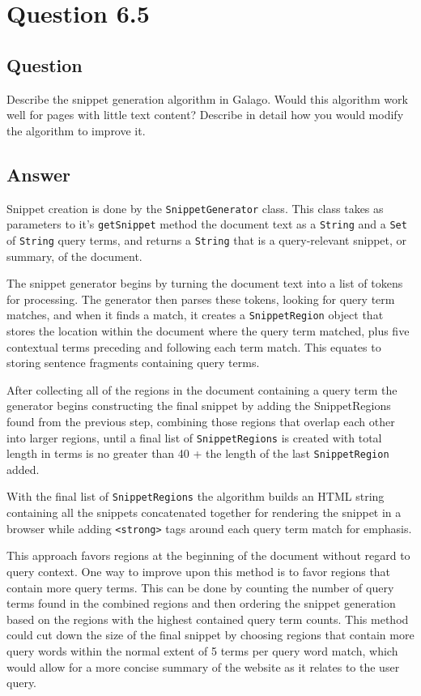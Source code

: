 \section{Question 6.5}

\subsection{Question}
Describe the snippet generation algorithm in Galago. Would this algorithm
work well for pages with little text content? Describe in detail how you would
modify the algorithm to improve it.


\subsection{Answer}
Snippet creation is done by the \texttt{SnippetGenerator} class.  This class takes as parameters to it's \texttt{getSnippet} method the document text as a \texttt{String} and a \texttt{Set} of \texttt{String} query terms, and returns a \texttt{String} that is a query-relevant snippet, or summary, of the document.

The snippet generator begins by turning the document text into a list of tokens for processing.  The generator then parses these tokens, looking for query term matches, and when it finds a match, it creates a \texttt{SnippetRegion} object that stores the location within the document where the query term matched, plus five contextual terms preceding and following each term match.  This equates to storing sentence fragments containing query terms.

After collecting all of the regions in the document containing a query term the generator begins constructing the final snippet by adding the SnippetRegions found from the previous step, combining those regions that overlap each other into larger regions, until a final list of \texttt{SnippetRegions} is created with total length in terms is no greater than 40 + the length of the last \texttt{SnippetRegion} added.

With the final list of \texttt{SnippetRegions} the algorithm builds an HTML string containing all the snippets concatenated together for rendering the snippet in a browser while adding \texttt{<strong>} tags around each query term match for emphasis.

This approach favors regions at the beginning of the document without regard to query context.  One way to improve upon this method is to favor regions that contain more query terms.  This can be done by counting the number of query terms found in the combined regions and then ordering the snippet generation based on the regions with the highest contained query term counts.  This method could cut down the size of the final snippet by choosing regions that contain more query words within the normal extent of 5 terms per query word match, which would allow for a more concise summary of the website as it relates to the user query. 